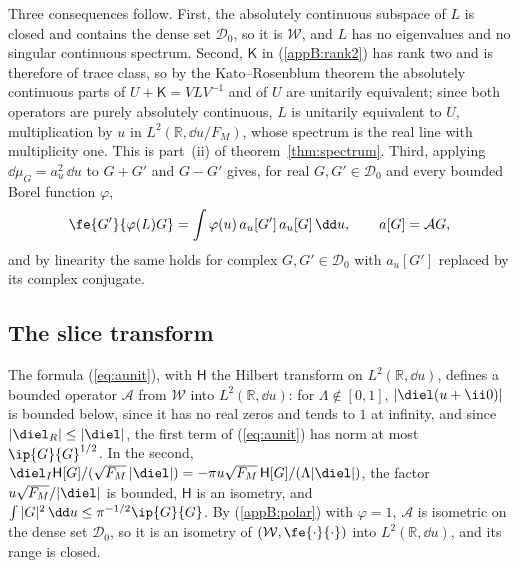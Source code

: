 Three consequences follow. First, the absolutely continuous subspace of $L$ is closed and contains the dense set $\mathcal D_0$, so it is $\mathcal W$, and $L$ has no eigenvalues and no singular continuous spectrum. Second, $\mathsf K$ in (\ref{appB:rank2}) has rank two and is therefore of trace class, so by the Kato--Rosenblum theorem \citep[][chapter~X]{Kato1966} the absolutely continuous parts of $U+\mathsf K=VLV^{-1}$ and of $U$ are unitarily equivalent; since both operators are purely absolutely continuous, $L$ is unitarily equivalent to $U$, multiplication by $u$ in $L^2(\mathbb R,\dd u/F_M)$, whose spectrum is the real line with multiplicity one. This is part~(ii) of theorem~\ref{thm:spectrum}. Third, applying $\dd\mu_G=a_u^2\,\dd u$ to $G+G'$ and $G-G'$ gives, for real $G,G'\in\mathcal D_0$ and every bounded Borel function $\varphi$,
\begin{equation}\label{appB:polar}
  \fe{G'}{\varphi(L)G}=\int\varphi(u)\,a_u[G']\,a_u[G]\,\dd u,\qquad a[G]=\mathcal AG ,
\end{equation}
and by linearity the same holds for complex $G,G'\in\mathcal D_0$ with $a_u[G']$ replaced by its complex conjugate.

\subsection{The slice transform}\label{appB:transform}

The formula (\ref{eq:aunit}), with $\mathsf H$ the Hilbert transform on $L^2(\mathbb R,\dd u)$, defines a bounded operator $\mathcal A$ from $\mathcal W$ into $L^2(\mathbb R,\dd u)$: for $\Lambda\notin[0,1]$, $|\diel(u+\ii0)|$ is bounded below, since it has no real zeros and tends to $1$ at infinity, and since $|\diel_R|\le|\diel|$, the first term of (\ref{eq:aunit}) has norm at most $\ip{G}{G}^{1/2}$. In the second, $\diel_I\mathsf H[G]/(\sqrt{F_M}\,|\diel|)=-\pi u\sqrt{F_M}\,\mathsf H[G]/(\Lambda|\diel|)$, the factor $u\sqrt{F_M}/|\diel|$ is bounded, $\mathsf H$ is an isometry, and $\int|G|^2\,\dd u\le\pi^{-1/2}\ip{G}{G}$. By (\ref{appB:polar}) with $\varphi=1$, $\mathcal A$ is isometric on the dense set $\mathcal D_0$, so it is an isometry of $(\mathcal W,\fe{\cdot}{\cdot})$ into $L^2(\mathbb R,\dd u)$, and its range is closed.

